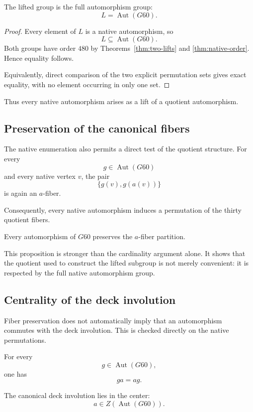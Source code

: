 \begin{theorem}
\label{thm:lifted-equals-full}
The lifted group is the full automorphism group:
\[
L=\operatorname{Aut}(G60).
\]
\end{theorem}

\begin{proof}
Every element of $L$ is a native automorphism, so
\[
L\subseteq\operatorname{Aut}(G60).
\]
Both groups have order $480$ by Theorems~\ref{thm:two-lifts} and
\ref{thm:native-order}. Hence equality follows.

Equivalently, direct comparison of the two explicit permutation sets
gives exact equality, with no element occurring in only one set.
\end{proof}

Thus every native automorphism arises as a lift of a quotient
automorphism.

\subsection{Preservation of the canonical fibers}

The native enumeration also permits a direct test of the quotient
structure. For every
\[
g\in\operatorname{Aut}(G60)
\]
and every native vertex $v$, the pair
\[
\{g(v),g(a(v))\}
\]
is again an $a$-fiber.

Consequently, every native automorphism induces a permutation of the
thirty quotient fibers.

\begin{proposition}
\label{prop:fiber-preservation}
Every automorphism of $G60$ preserves the $a$-fiber partition.
\end{proposition}

This proposition is stronger than the cardinality argument alone. It
shows that the quotient used to construct the lifted subgroup is not
merely convenient: it is respected by the full native automorphism
group.

\subsection{Centrality of the deck involution}

Fiber preservation does not automatically imply that an automorphism
commutes with the deck involution. This is checked directly on the
native permutations.

For every
\[
g\in\operatorname{Aut}(G60),
\]
one has
\[
ga=ag.
\]

\begin{proposition}
\label{prop:deck-central}
The canonical deck involution lies in the center:
\[
a\in Z(\operatorname{Aut}(G60)).
\]
\end{proposition}

